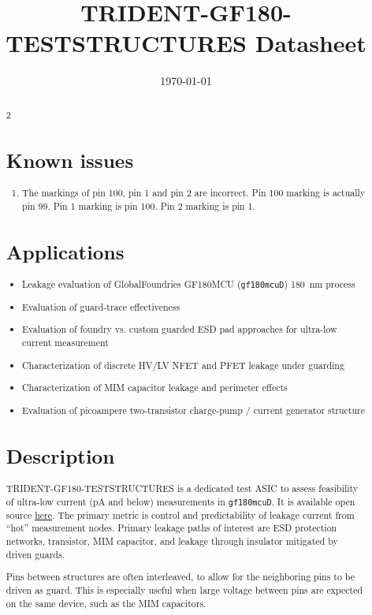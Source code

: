 \documentclass{cernatsnote}
\title{TRIDENT-GF180-TESTSTRUCTURES Datasheet}
\date{\today}
\begin{document}
\renewcommand{\abstractname}{\vspace{-\baselineskip}} %
\setlength{\absleftindent}{0mm}
\setlength{\absrightindent}{0mm}
\maketitle

\begin{abstract}
\begin{multicols}{2}
\section{Known issues}
\begin{enumerate}
    \item The markings of pin 100, pin 1 and pin 2 are incorrect. Pin 100 marking is actually pin 99. Pin 1 marking is pin 100. Pin 2 marking is pin 1.
\end{enumerate}


\section{Applications}
\begin{itemize}
  \item Leakage evaluation of GlobalFoundries GF180MCU (\texttt{gf180mcuD}) \SI{180}{\nano\meter} process
  \item Evaluation of guard-trace effectiveness
  \item Evaluation of foundry vs. custom guarded ESD pad approaches for ultra-low current measurement
  \item Characterization of discrete HV/LV NFET and PFET leakage under guarding
  \item Characterization of MIM capacitor leakage and perimeter effects
  \item Evaluation of picoampere two-transistor charge-pump / current generator structure
\end{itemize}

\section{Description}
TRIDENT-GF180-TESTSTRUCTURES is a dedicated test ASIC to assess feasibility of ultra-low current (pA and below) measurements in \texttt{gf180mcuD}.
It is available open source \href{https://github.com/Scafir/gf180mcu-project-trident-gf180-teststructure}{here}.
The primary metric is control and predictability of leakage current from ``hot'' measurement nodes. Primary leakage paths of interest are ESD protection networks, transistor, MIM capacitor, and leakage through insulator mitigated by driven guards.

Pins between structures are often interleaved, to allow for the neighboring pins to be driven as guard.
This is especially useful when large voltage between pins are expected on the same device, such as the MIM capacitors.


\end{multicols}
\end{abstract}
\end{document}
